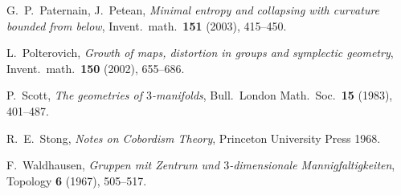 \documentclass[12pt]{amsart}
\theoremstyle{definition}
\theoremstyle{remark}
\begin{document}
\begin{thebibliography}{999}
G.~P.~Paternain, J.~Petean,
{\it Minimal entropy and collapsing with curvature bounded from 
below},
Invent.~math.~{\bf 151} (2003), 415--450.

L.~Polterovich, 
{\it Growth of maps, distortion in groups and symplectic geometry},
Invent.~math.~{\bf 150} (2002), 655--686.

P.~Scott,
{\it The geometries of $3$-manifolds},
Bull.~London Math.~Soc.~{\bf 15} (1983), 401--487.

R.~E.~Stong,
{\sl Notes on Cobordism Theory},
Princeton University Press 1968.

F.~Waldhausen,
{\it Gruppen mit Zentrum und $3$-dimensionale Mannigfaltigkeiten}, 
Topology {\bf 6} (1967), 505--517.

\end{thebibliography}
\end{document}
